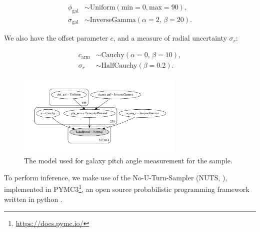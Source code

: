 \begin{align}
  \phi_\mathrm{gal} &\sim \mathrm{Uniform}(\mathrm{min}=0, \mathrm{max}=90),\\
  \sigma_\mathrm{gal} &\sim \mathrm{InverseGamma}(\alpha=2,\,\beta=20).
\end{align}

We also have the offset parameter $c$, and a measure of radial uncertainty $\sigma_r$:

\begin{align}
  c_\mathrm{arm} &\sim \mathrm{Cauchy}(\alpha=0,\,\beta=10),\\
  \sigma_r &\sim \mathrm{HalfCauchy}(\beta=0.2).
\end{align}

\begin{figure}
  \includegraphics[width=8cm]{plots/plots_n109d1000t500/model.pdf}
  \caption{The model used for galaxy pitch angle measurement for the sample.}
  \label{fig:pymc3-model}
\end{figure}

To perform inference, we make use of the No-U-Turn-Sampler (NUTS, \citealt{2011arXiv1111.4246H}), implemented in PYMC3\footnote{\url{https://docs.pymc.io/}}, an open source probabilistic programming framework written in python \citep{pymc3_paper}.
